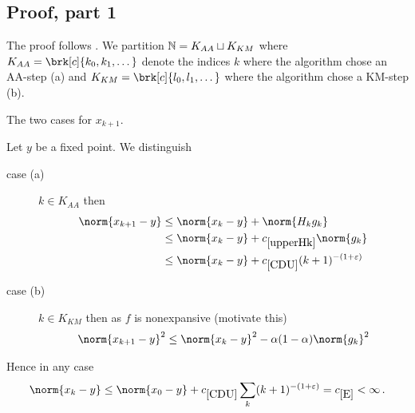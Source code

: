\begin{frame}
	\begin{proofs}
	\vspace*{1cm}
	\centering
	\scalebox{0.9}{
	
	}
	\end{proofs}
\end{frame}
\subsection{Proof, part 1}
\begin{frame}
	\begin{proofs}
	The proof follows \cite[Theorem 6]{ZhaAA}.
	We partition $\mathbb{N}=K_{AA}\sqcup K_{KM}$ where $K_{AA}=\brk[c]{k_0,k_1,\dots}$ denote the indices $k$ where the algorithm chose an AA-step (a) and $K_{KM}=\brk[c]{l_0,l_1,\dots}$ where the algorithm chose a KM-step (b).
	
	\begin{center}
	\begin{algorithm}[H]
	\caption{The two cases for $x_{k+1}$.}
	\end{algorithm}
	\end{center}
	\end{proofs}
\end{frame}


\begin{frame}
	\begin{proofs}
	Let $y$ be a fixed point. We distinguish
	\begin{description}
		\item[case (a)]
		$k\in K_{AA}$ then
		\begin{equation}
		\begin{aligned}
			\norm{x_{k+1}-y}&\leq \norm{x_k-y}+\norm{H_kg_k} \\
			&\leq \norm{x_k-y}+\useconstant{upperHk}\norm{g_k} \\
			&\leq \norm{x_k-y}+\useconstant{CDU}(k+1)^{-(1+\e)}
			\label{eq:16}
		\end{aligned}
		\end{equation}
		\item[case (b)]
		$k\in K_{KM}$ then as $f$ is nonexpansive (motivate this)
		\begin{align}
			\norm{x_{k+1}-y}^2\leq \norm{x_k-y}^2-\alpha(1-\alpha)\norm{g_k}^2
			\label{eq:17}
		\end{align}
	\end{description}
	Hence in any case
	\begin{align*}
		\norm{x_k-y}
		\leq \norm{x_0-y}+\useconstant{CDU}\sum_k(k+1)^{-(1+\e)}
		= \useconstant{E}<\infty\,.
	\end{align*}
	\end{proofs}
\end{frame}


